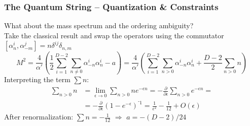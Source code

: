 \documentclass[aspectratio=169]{beamer}
\begin{document}
	\begin{frame}
		\frametitle{The Quantum String -- Quantization \& Constraints}
		What about the mass spectrum and the ordering ambiguity?\\
		Take the classical result and swap the operators using the commutator 			$\left[\alpha^i_n,\alpha^j_{-m}\right]= n\delta^{ij}\delta_{n,m}$
		\begin{equation*}
			M^2 = \frac{4}{\alpha'} \left(\frac{1}{2}\sum_{i=1}^{D-2}\sum_{n\neq 0}^{}\alpha^i_{-n}\alpha^i_n -a \right) = \frac{4}{\alpha'} \left(\sum_{i=1}^{D-2}\sum_{n>0}\alpha^i_{-n}\alpha^i_n+\frac{D-2}{2}\sum_{n>0}n\right)
		\end{equation*}
		Interpreting the term $\sum n$:
		\begin{align*}
			\sum_{n>0}n &= \lim_{\epsilon\rightarrow 0} \sum_{n>0}ne^{-\epsilon n} = -\frac{\partial}{\partial\epsilon}\sum_{n>0}e^{-\epsilon n} = \\
			& = -\frac{\partial}{\partial\epsilon} (1-e^{-\epsilon})^{⁻1} = \frac{1}{\epsilon^2}-\frac{1}{12}+O(\epsilon)
		\end{align*}
		After renormalization: $\sum n = -\frac{1}{12}$ \quad $\Rightarrow$ \quad $a=-(D-2)/24$
	\end{frame}
\end{document}
